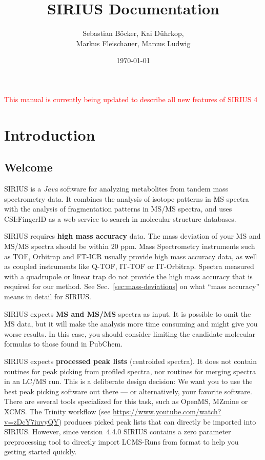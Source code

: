 \documentclass[letterpaper,10pt,openany,oneside]{sphinxmanual}
\title{SIRIUS Documentation}
\date{\today}
\author{Sebastian Böcker, Kai Dührkop, \\ Markus Fleischauer, Marcus Ludwig}
\begin{document}
\maketitle
{\huge\textcolor{red}{ This manual is currently being updated to describe 
all new features of SIRIUS 4}}

\tableofcontents
{}\label{index::doc}



\chapter{Introduction}
\label{introduction:introduction}
\label{introduction::doc}
\label{introduction:welcome-to-sirius-s-documentation}

\section{Welcome}

SIRIUS is a \emph{Java} software for analyzing metabolites from tandem mass
spectrometry data. It combines the analysis of isotope patterns in MS spectra
with the analysis of fragmentation patterns in MS/MS spectra, and uses
CSI:FingerID as a web service to search in molecular structure databases.

SIRIUS requires \textbf{high mass accuracy} data. The mass deviation of
your MS and MS/MS spectra should be within 20 ppm.  Mass Spectrometry
instruments such as TOF, Orbitrap and FT-ICR usually provide high mass
accuracy data, as well as coupled instruments like Q-TOF, IT-TOF or
IT-Orbitrap.  Spectra measured with a quadrupole or linear trap do not
provide the high mass accuracy that is required for our method.  See
Sec.~\ref{sec:mass-deviations} on what ``mass accuracy'' means in detail for
SIRIUS.

SIRIUS expects \textbf{MS and MS/MS} spectra as input.  It is possible to
omit the MS data, but it will make the analysis more time consuming and
might give you worse results.  In this case, you should consider limiting the
candidate molecular formulas to those found in PubChem.

SIRIUS expects \textbf{processed peak lists} (centroided spectra). It does
not contain routines for peak picking from profiled spectra, nor routines for
merging spectra in an LC/MS run.  This is a deliberate design decision: We
want you to use the best peak picking software out there --- or
alternatively, your favorite software.  There are several tools specialized
for this task, such as OpenMS, MZmine or XCMS.  The Trinity workflow
(see \url{https://www.youtube.com/watch?v=zDcY7iuvyQY}) produces picked peak
lists that can directly be imported into SIRIUS. However, since version~4.4.0 SIRIUS contains a zero parameter preprocessing tool to directly import LCMS-Runs from  format to help you getting started quickly. 
\end{document}
